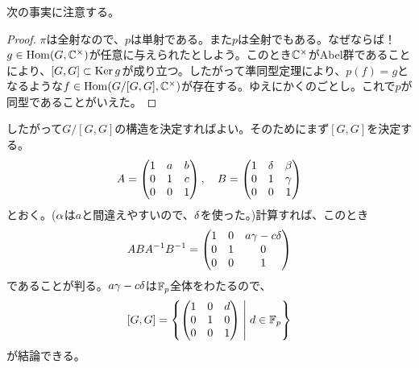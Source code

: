 \subsubsection{} %
\begin{sol}
 次の事実に注意する。
\begin{proof}
$\pi$は全射なので、$p$は単射である。また$p$は全射でもある。なぜならば！$g \in \operatorname{Hom}(G, {\mathbb C}^{\times})$が任意に与えられたとしよう。このとき${\mathbb C}^{\times}$がAbel群であることにより、$[G,G] \subset \operatorname{Ker} g$が成り立つ。したがって準同型定理により、$p(f) = g$となるような$f \in \operatorname{Hom}(G/[G,G], {\mathbb C}^{\times})$が存在する。ゆえにかくのごとし。これで$p$が同型であることがいえた。
\end{proof}

 したがって$G/[G,G]$の構造を決定すればよい。そのためにまず$[G,G]$を決定する。
    \[
    A = \begin{pmatrix} 1 & a & b \\ 0 & 1 & c \\ 0 & 0 & 1 \end{pmatrix},  \quad B = \begin{pmatrix} 1 & {\delta} & \beta \\ 0 & 1 & {\gamma} \\ 0 & 0 & 1 \end{pmatrix}
    \]
    とおく。(${\alpha}$は$a$と間違えやすいので、${\delta}$を使った。)計算すれば、このとき
    \begin{align*}
    ABA^{-1}B^{-1} = \begin{pmatrix} 1 & 0  & a {\gamma} - c {\delta} \\ 0 & 1 & 0 \\ 0 & 0 & 1  \end{pmatrix}
  \end{align*}
  であることが判る。$a {\gamma} - c {\delta}$は${\mathbb F}_p$全体をわたるので、
  \[
  [G,G] = \left\{  \begin{pmatrix} 1 & 0 & d \\ 0 & 1 & 0 \\ 0 & 0 & 1 \end{pmatrix}  \mathrel{} \middle| \mathrel{} d \in {\mathbb F}_p  \right\}
  \]
  が結論できる。


\end{sol}

